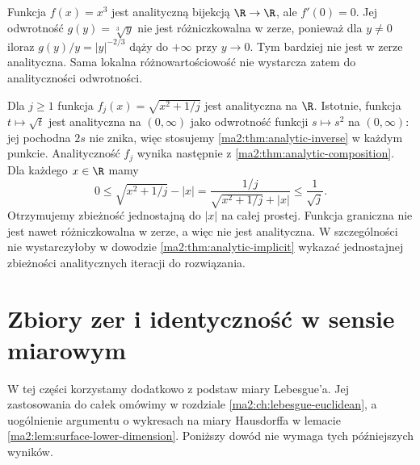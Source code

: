 \begin{przyklad}
\label{ma2:ex:analytic-inverse-singular}
Funkcja $f(x)=x^3$ jest analityczną
bijekcją $\R\to\R$, ale $f'(0)=0$.
Jej odwrotność $g(y)=\sqrt[3]{y}$
nie jest różniczkowalna w zerze, ponieważ
dla $y\ne0$ iloraz $g(y)/y=|y|^{-2/3}$
dąży do $+\infty$ przy $y\to0$.
Tym bardziej nie jest w zerze analityczna.
Sama lokalna różnowartościowość nie wystarcza
zatem do analityczności odwrotności.
\end{przyklad}


\begin{przyklad}
\label{ma2:ex:analytic-uniform-limit}
Dla $j\ge1$ funkcja $f_j(x)=\sqrt{x^2+1/j}$
jest analityczna na $\R$.
Istotnie, funkcja $t\mapsto\sqrt t$ jest
analityczna na $(0,\infty)$ jako odwrotność
funkcji $s\mapsto s^2$ na $(0,\infty)$:
jej pochodna $2s$ nie znika, więc stosujemy
\ref{ma2:thm:analytic-inverse} w każdym punkcie.
Analityczność $f_j$ wynika następnie z
\ref{ma2:thm:analytic-composition}.
Dla każdego $x\in\R$ mamy
\[
 0\le \sqrt{x^2+1/j}-|x|
 =\frac{1/j}{\sqrt{x^2+1/j}+|x|}
 \le \frac{1}{\sqrt j}.
\]
Otrzymujemy zbieżność jednostajną do $|x|$
na całej prostej. Funkcja graniczna nie jest
nawet różniczkowalna w zerze, a więc nie jest
analityczna. W szczególności nie wystarczyłoby
w dowodzie \ref{ma2:thm:analytic-implicit}
wykazać jednostajnej zbieżności analitycznych
iteracji do rozwiązania.
\end{przyklad}

\section{Zbiory zer i identyczność w sensie miarowym}

W tej części korzystamy dodatkowo z podstaw
miary Lebesgue'a. Jej zastosowania do całek
omówimy w rozdziale \ref{ma2:ch:lebesgue-euclidean},
a uogólnienie argumentu o wykresach na miary
Hausdorffa w lemacie
\ref{ma2:lem:surface-lower-dimension}.
Poniższy dowód nie wymaga tych późniejszych wyników.

